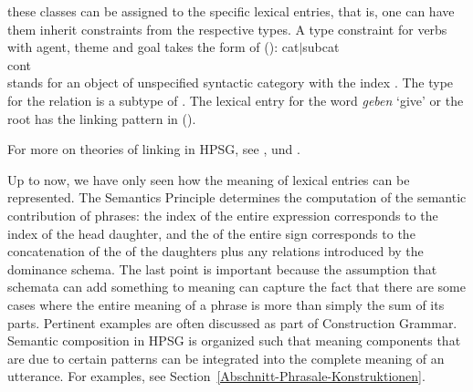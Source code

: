 these classes can be assigned to the specific lexical entries, that is, one can have them inherit
constraints from the respective types. A type constraint for verbs with agent, theme
and goal takes the form of ():
\ea
\label{ex-agens-theme-goal-linking}
\onems
{ cat$|$subcat  \\[1mm]
  cont   \\
}
\z
[] stands for an object of unspecified syntactic category with the index
. 
The type for the relation  is a subtype of .
The lexical entry for the word \emph{geben} `give' or the root  has the linking pattern in ().

For more on theories of linking in HPSG, see ,  und .

Up to now, we have only seen how the meaning of lexical entries can be represented. The Semantics Principle
determines the computation of the semantic contribution of phrases: the index of the entire expression corresponds to the index of
the head daughter, and the \relsv of the entire sign corresponds to the concatenation of the \relsvs of the daughters plus any relations
introduced by the dominance schema. The last point is important because the assumption that schemata can add something to meaning can capture
the fact that there are some cases where the entire meaning of a phrase is more than simply the sum of its parts.
Pertinent examples are often discussed as part of Construction Grammar\indexcxg. Semantic
composition in HPSG is organized such that meaning components that are due to certain patterns can be integrated into the complete meaning of an utterance. For examples, see Section~\ref{Abschnitt-Phrasale-Konstruktionen}.

